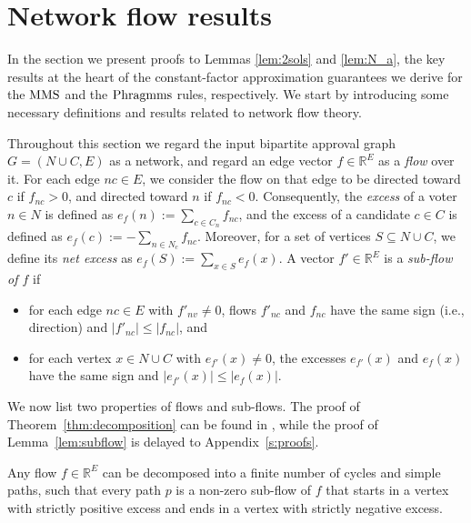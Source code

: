 \section{Network flow results}\label{s:flow}

In the section we present proofs to Lemmas \ref{lem:2sols} and \ref{lem:N_a}, the key results at the heart of the constant-factor approximation guarantees we derive for the $\operatorname{MMS}$ and the $\operatorname{Phragmms}$ rules, respectively. 
We start by introducing some necessary definitions and results related to network flow theory.

Throughout this section we regard the input bipartite approval graph $G=(N\cup C,E)$ as a network, and regard an edge vector $f\in\mathbb{R}^{E}$ as a \emph{flow} over it. For each edge $nc\in E$, we consider the flow on that edge to be directed toward $c$ if $f_{nc}>0$, and directed toward $n$ if $f_{nc}<0$. 
Consequently, the \emph{excess} of a voter $n\in N$ is defined as $e_f(n):=\sum_{c\in C_n} f_{nc}$, and the excess of a candidate $c\in C$ is defined as $e_f(c):=-\sum_{n\in N_c} f_{nc}$. 
Moreover, for a set of vertices $S\subseteq N\cup C$, we define its \emph{net excess} as $e_f(S):=\sum_{x\in S} e_f(x)$.
A vector $f'\in\mathbb{R}^E$ is a \emph{sub-flow of $f$} if 
\begin{itemize}
	\item for each edge $nc\in E$ with $f'_{nv}\neq 0$, flows $f'_{nc}$ and $f_{nc}$ have the same sign (i.e., direction) and $|f'_{nc}|\leq |f_{nc}|$, and
	\item for each vertex $x\in N\cup C$ with $e_{f'}(x)\neq 0$, the excesses $e_{f'}(x)$ and $e_{f}(x)$ have the same sign and $|e_{f'}(x)|\leq |e_{f}(x)|$.
\end{itemize}

We now list two properties of flows and sub-flows. 
The proof of Theorem~\ref{thm:decomposition} can be found in \cite[Thm.~3.15]{ahuja1994improved}, while the proof of Lemma~\ref{lem:subflow} is delayed to Appendix~\ref{s:proofs}.

\begin{theorem}\label{thm:decomposition}
Any flow $f\in\mathbb{R}^E$ can be decomposed into a finite number of cycles and simple paths, such that every path $p$ is a non-zero sub-flow of $f$ that starts in a vertex with strictly positive excess and ends in a vertex with strictly negative excess. 
\end{theorem}

